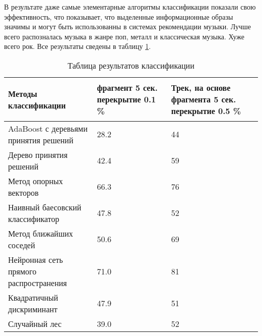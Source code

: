 В результате даже самые элементарные алгоритмы классификации показали свою эффективность, что показывает, что выделенные информационные образы значимы и могут быть использованны в системах рекомендации музыки. Лучше всего распозналась музыка в жанре поп, металл и классическая музыка. Хуже всего рок.  Все результаты сведены в таблицу
\ref{table:result:result}.



\begin{table}[!ht]
\caption{Таблица результатов классификации}
\label{table:result:result}
  \centering
  \begin{tabular}{| >{\raggedright}m{}
                  | >{\centering}m{}
                  | >{\centering\arraybackslash}m{}|}
    \hline
    {\begin{center}
    Методы классификации
    \end{center} } &  фрагмент 5 сек. перекрытие 0.1 \% &  Трек, на основе фрагмента 5 сек. перекрытие 0.5 \%  \\
    
    \hline
    
    AdaBoost с деревьями принятия решений & \num{28,2} & \num{44}  \\
    
    \hline

    Дерево принятия решений & \num{42,4} & \num{59}  \\

    \hline

    Метод опорных векторов & \num{66,3} & \num{76}   \\

    \hline

    Наивный баесовский классификатор & \num{47,8} & \num{52} \\

    \hline

    Метод ближайших соседей & \num{50,6} & \num{69} \\

    \hline

    Нейронная сеть прямого распространения & \num{71,0} & \num{81} \\

    \hline
    
    Квадратичный дискриминант & \num{47,9} & \num{51} \\

    \hline

    Случайный лес & \num{39,0} & \num{52}  \\

    \hline

  \end{tabular}
\end{table}





